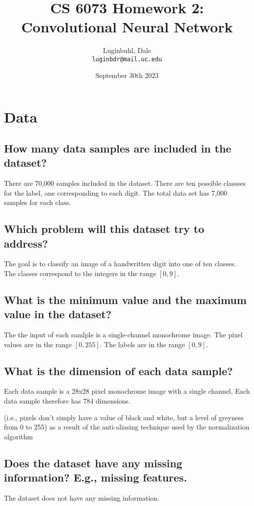 \documentclass{article}
\title{CS 6073 Homework 2: Convolutional Neural Network}
\author{
    Luginbuhl, Dale \\
    \texttt{luginbdr@mail.uc.edu}
}
\date{September 30th 2023}
\begin{document}
\maketitle

\section{Data}
\subsection{How many data samples are included in the dataset?}
There are 70,000 samples included in the dataset. There are ten possible classses 
for the label, one corresponding to each digit. The total data set has 7,000 samples 
for each class.

\subsection{Which problem will this dataset try to address?}
The goal is to classify an image of a handwritten digit into one of ten classes.
The classes correspond to the integers in the range $[0,9]$.

\subsection{What is the minimum value and the maximum value in the dataset?}
The the input of each samlple is a single-channel monochrome image. The pixel values
are in the range $[0,255]$. The labels are in the range $[0,9]$.

\subsection{What is the dimension of each data sample?}
Each data sample is a 28x28 pixel monochrome image with a single channel. Each data 
sample therefore has 784 dimensions.

(i.e., pixels don't simply have a value of black and white, but a level of greyness from 0 to 255) as a result of the anti-aliasing technique used by the normalization algorithm

\subsection{Does the dataset have any missing information? E.g., missing features.}
The dataset does not have any missing information.
\end{document}
